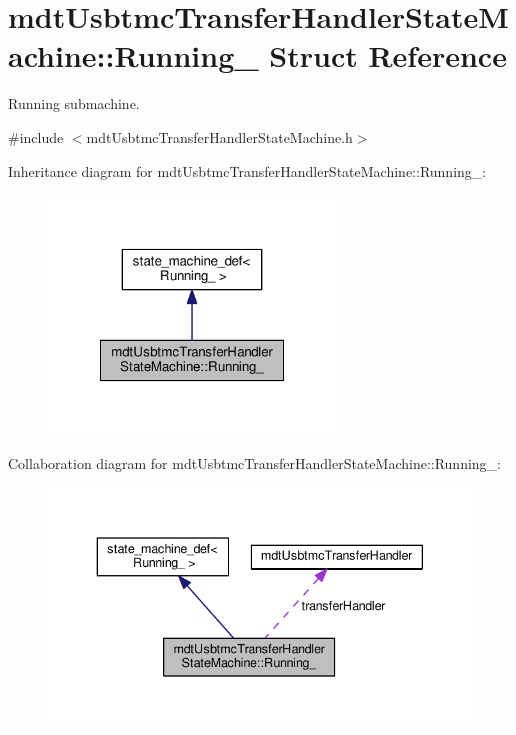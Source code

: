 \hypertarget{structmdt_usbtmc_transfer_handler_state_machine_1_1_running__}{\section{mdt\-Usbtmc\-Transfer\-Handler\-State\-Machine\-:\-:Running\-\_\- Struct Reference}
\label{structmdt_usbtmc_transfer_handler_state_machine_1_1_running__}
}


Running submachine.  




{\ttfamily \#include $<$mdt\-Usbtmc\-Transfer\-Handler\-State\-Machine.\-h$>$}



Inheritance diagram for mdt\-Usbtmc\-Transfer\-Handler\-State\-Machine\-:\-:Running\-\_\-\-:\nopagebreak
\begin{figure}[H]
\begin{center}
\leavevmode
\includegraphics[width=216pt]{structmdt_usbtmc_transfer_handler_state_machine_1_1_running____inherit__graph}
\end{center}
\end{figure}


Collaboration diagram for mdt\-Usbtmc\-Transfer\-Handler\-State\-Machine\-:\-:Running\-\_\-\-:\nopagebreak
\begin{figure}[H]
\begin{center}
\leavevmode
\includegraphics[width=339pt]{structmdt_usbtmc_transfer_handler_state_machine_1_1_running____coll__graph}
\end{center}
\end{figure}

